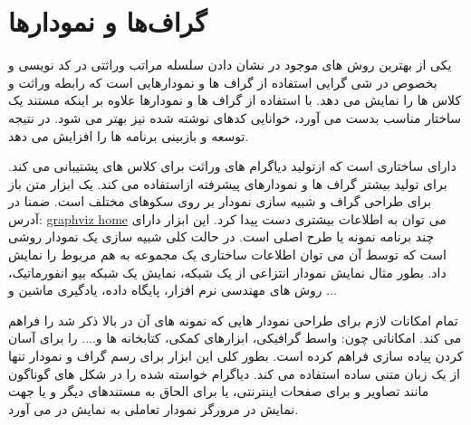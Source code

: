 %
% 
% 
% 
%
% 
% 
% 
% 
\chapter{گراف‌ها و نمودارها}



یکی از بهترین روش های موجود در نشان دادن سلسله مراتب وراثتی در کد نویسی و بخصوص
در شی گرایی استفاده از گراف ها و نمودارهایی است که رابطه وراثت و کلاس ها را
نمایش می دهد.
با استفاده از گراف ها و نمودارها علاوه بر اینکه مستند یک ساختار مناسب بدست می آورد، خوانایی
کدهای نوشته شده نیز بهتر می شود. در نتیجه توسعه و بازبینی برنامه ها را افزایش می دهد.

 دارای ساختاری است که ازتولید دیاگرام های وراثت برای کلاس های پشتیبانی می کند.
   برای تولید بیشتر گراف ها و نمودارهای پیشرفته
ازاستفاده می کند. یک ابزار متن باز برای طراحی گراف و
شبیه سازی نمودار بر روی سکوهای مختلف است. ضمنا در آدرس:
 \href{http://www.graphviz.org/}{graphviz home} می توان به اطلاعات بیشتری دست پیدا کرد.
این ابزار دارای چند برنامه نمونه یا طرح اصلی است. در حالت
کلی شبیه سازی یک نمودار روشی است که توسط آن می توان اطلاعات ساختاری یک مجموعه
به هم مربوط را نمایش داد. بطور مثال نمایش نمودار انتزاعی از یک شبکه، نمایش یک
شبکه بیو انفورماتیک، روش های مهندسی نرم افزار، پایگاه داده، یادگیری ماشین و
...

 تمام امکانات لازم برای طراحی نمودار هایی که نمونه های آن در بالا
ذکر شد را فراهم می کند. امکاناتی چون: واسط گرافیکی، ابزارهای کمکی، کتابخانه ها
و.... را برای آسان کردن پیاده سازی فراهم کرده است. 
بطور کلی این ابزار برای رسم گراف و نمودار تنها از یک زبان متنی ساده استفاده می کند.
 دیاگرام خواسته شده را در شکل های گوناگون مانند تصاویر و   برای صفحات اینترنتی،  یا  برای الحاق به مستندهای دیگر و یا جهت نمایش در مرورگر نمودار تعاملی به نمایش در می آورد.
 
